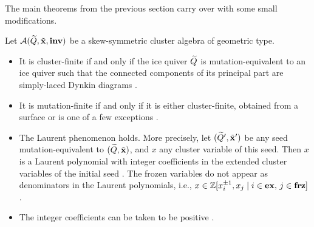 The main theorems from the previous section carry over with some small modifications.
\begin{theorem}

	Let $\mathcal{A}(\widetilde{Q}, \tilde{\mathbf{x}}, \mathbf{inv})$ be a skew-symmetric cluster algebra of geometric type.
	\begin{itemize}
		\item It is cluster-finite if and only if the ice quiver $\widetilde{Q}$ is mutation-equivalent to an
		      ice quiver such that the connected components of its principal part are simply-laced
		      Dynkin diagrams \cite{FominZelevinsky2003CAFin}.
		\item It is mutation-finite if and only if it is either cluster-finite, obtained from a
		      surface or is one of a few exceptions \cite{FeliksonPavel2023cluster}.
		\item The Laurent phenomenon holds. More precisely, let $(\widetilde{Q}', \tilde{\mathbf{x}}')$ be any seed
		      mutation-equivalent to $(\widetilde{Q}, \tilde{\mathbf{x}})$, and $x$ any cluster variable of this seed. Then
		      $x$ is a Laurent polynomial with integer coefficients in the extended cluster variables
		      of the initial seed \cite{FominZelevinsky2002CAF}. The frozen variables do not appear
		      as denominators in the Laurent polynomials, i.e., $x \in \mathbb{Z}[x_i^{\pm 1}, x_j \mid i
			      \in \mathbf{ex},\, j \in \mathbf{frz}]$ \cite[Theorem 3.3.6]{FominWilliams2021IntroductionCA_1-3}.
		\item The integer coefficients can be taken to be positive
		      \parencite{LeeSchiffler2015PositivityCA}.
	\end{itemize}
\end{theorem}

